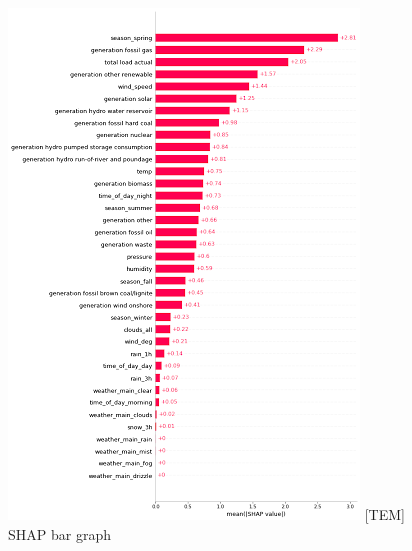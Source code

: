\documentclass[10pt]{article}
\begin{document}
\begin{figure}[H]
    \centering
    \begin{minipage}[t]{0.45\textwidth}
    \centering
    \hspace*{-2.5cm} 
    \includegraphics[width=1.2\linewidth]{shapbar.png}
    [TEM]{ SHAP bar graph}
    \label{shapbar}
    \end{minipage}%
    \hfill
    \begin{minipage}[t]{0.45\textwidth}
    \centering
    \hspace*{-2.5cm} 

\end{minipage}
\end{figure}
\end{document}
